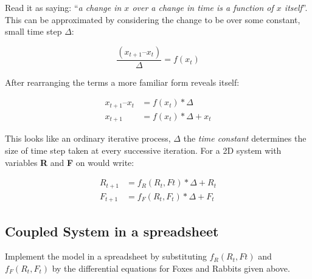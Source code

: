 \documentclass[]{book}
\begin{document}
Read it as saying: ``\emph{a change in \(x\) over a change in time is a
function of \(x\) itself}''. This can be approximated by considering the
change to be over some constant, small time step \(\Delta\):

\begin{equation}
\frac{(x_{t+1} – x_t)}{\Delta} = f(x_t)
\label{eq:Euler}
\end{equation}

After rearranging the terms a more familiar form reveals itself:

\begin{align}
x_{t+1} – x_t &= f(x_t) * \Delta \\
x_{t+1} &= f(x_t) * \Delta + x_t
\label{eq:Euler2}
\end{align}

This looks like an ordinary iterative process, \(\Delta\) the \emph{time
constant} determines the size of time step taken at every successive
iteration. For a 2D system with variables \textbf{R} and \textbf{F} on
would write:

\begin{align}
R_{t+1} &= f_R(R_t,Ft) * \Delta + R_t \\
F_{t+1} &= f_F(R_t,F_t) * \Delta + F_t
\label{eq:EulerRF}
\end{align}

\subsection{Coupled System in a
spreadsheet}\label{coupled-system-in-a-spreadsheet}

Implement the model in a spreadsheet by substituting \(f_R(R_t,Ft)\) and
\(f_F(R_t,F_t)\) by the differential equations for Foxes and Rabbits
given above.
\end{document}
